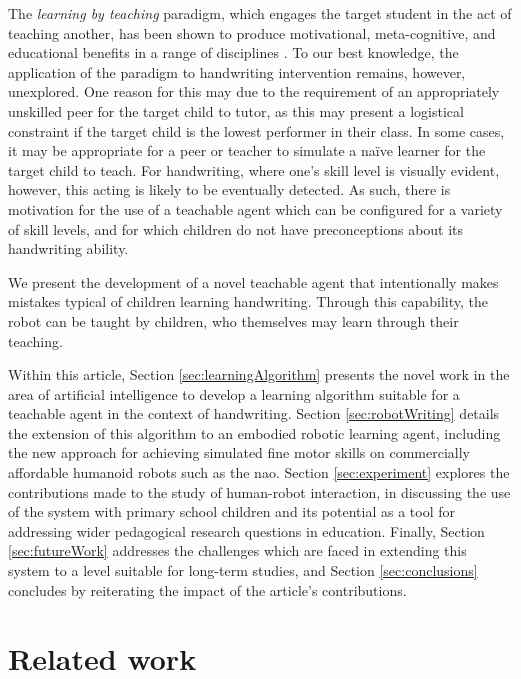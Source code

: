 \documentclass{sig-alternate}
\begin{document}
The \emph{learning by teaching} paradigm, which engages the target student in
the act of teaching another, has been shown to produce motivational,
meta-cognitive, and educational benefits in a range of disciplines
\cite{Rohrbeck2003}. To our best knowledge, the application of the paradigm to
handwriting intervention remains, however, unexplored. One reason for this may
due to the requirement of an appropriately unskilled peer for the target child
to tutor, as this may present a logistical constraint if the target child is the
lowest performer in their class.  In some cases, it may be appropriate for a
peer or teacher to simulate a na\"ive learner for the target child to teach.
For handwriting, where one's skill level is visually evident, however, this
acting is likely to be eventually detected. As such, there is motivation for the
use of a teachable agent which can be configured for a variety of skill levels,
and for which children do not have preconceptions about its handwriting ability.

We present the development of a novel teachable agent that intentionally makes
mistakes typical of children learning handwriting. Through this capability, the
robot can be taught by children, who themselves may learn through their
teaching.

Within this article, Section \ref{sec:learningAlgorithm} presents the novel work
in the area of artificial intelligence to develop a learning algorithm suitable
for a teachable agent in the context of handwriting. Section
\ref{sec:robotWriting} details the extension of this algorithm to an embodied
robotic learning agent, including the new approach for achieving simulated fine
motor skills on commercially affordable humanoid robots such as the {\sc nao}.
Section \ref{sec:experiment} explores the contributions made to the study of
human-robot interaction, in discussing the use of the system with primary school
children and its potential as a tool for addressing wider pedagogical research
questions in education. Finally, Section \ref{sec:futureWork} addresses the
challenges which are faced in extending this system to a level suitable for
long-term studies, and Section \ref{sec:conclusions} concludes by reiterating
the impact of the article's contributions.

\section{Related work}
\end{document}
